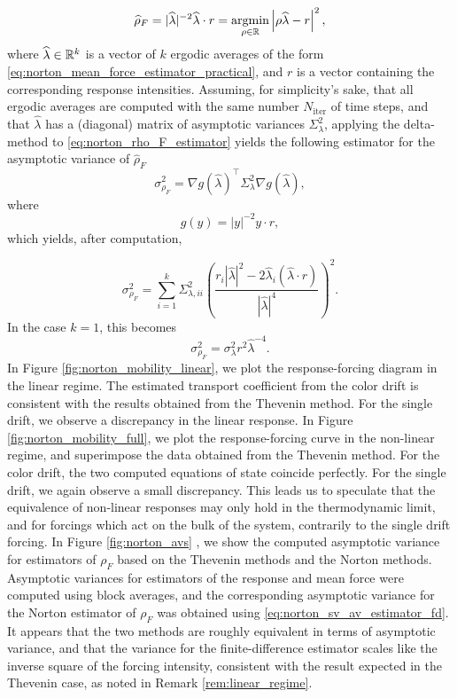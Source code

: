 \begin{equation}
    \label{eq:norton_rho_F_estimator}
    \widehat{\rho}_F= |\widehat{\lambda}|^{-2}\widehat{\lambda}\cdot r= \underset{\rho \in \mathbb{R}}{\mathrm{argmin}} \left| \rho\widehat{\lambda} - r\right|^2,
\end{equation}
where $\widehat{\lambda} \in \mathbb{R}^k$ is a vector of $k$ ergodic averages of the form \eqref{eq:norton_mean_force_estimator_practical}, and $r$ is a vector containing the corresponding response intensities.
Assuming, for simplicity's sake, that all ergodic averages are computed with the same number $N_{\mathrm{iter}}$ of time steps, and that $\widehat{\lambda}$ has a (diagonal) matrix of asymptotic variances $\Sigma_\lambda^2$, applying the delta-method to \eqref{eq:norton_rho_F_estimator} yields
the following estimator for the asymptotic variance of $\widehat{\rho}_F$
\[
\sigma^2_{\rho_F}= \nabla g(\widehat{\lambda})^\intercal \Sigma^2_\lambda\nabla g(\widehat{\lambda}),
\]
where 
\[g(y)=|y|^{-2}y\cdot r,\]
which yields, after computation,

\begin{equation}
    \label{eq:norton_sv_av_estimator}
    \sigma^2_{\rho_F} = \sum_{i=1}^k \Sigma_{\lambda,ii}^2\left(\frac{r_i|\widehat{\lambda}|^2-2\widehat{\lambda}_i(\widehat{\lambda}\cdot r)}{|\widehat{\lambda}|^4}\right)^2.
\end{equation}
In the case $k=1$, this becomes
\begin{equation}
    \label{eq:norton_sv_av_estimator_fd}
    \sigma^2_{\rho_F}=\sigma_{\lambda}^2 r^2\widehat{\lambda}^{-4}.
\end{equation}
In Figure \ref{fig:norton_mobility_linear}, we plot the response-forcing diagram in the linear regime. 
The estimated transport coefficient from the color drift is consistent with the results obtained from the Thevenin method. For the single drift, we observe a discrepancy in the linear response.
In Figure \ref{fig:norton_mobility_full}, we plot the response-forcing curve in the non-linear regime, and superimpose the data obtained from the Thevenin method. 
For the color drift, the two computed equations of state coincide perfectly. For the single drift, we again observe a small discrepancy.
This leads us to speculate that the equivalence of non-linear responses may only hold in the thermodynamic limit, and for forcings which act on the bulk of the system, contrarily to the single drift forcing.
In Figure \ref{fig:norton_avs} , we show the computed asymptotic variance for estimators of $\rho_F$ based on the Thevenin methods and the Norton methods. 
Asymptotic variances for estimators of the response and mean force were computed using block averages, and the corresponding asymptotic variance for the Norton estimator of $\rho_F$ was obtained using \eqref{eq:norton_sv_av_estimator_fd}.
It appears that the two methods are roughly equivalent in terms of asymptotic variance, and that the variance for the finite-difference estimator scales like the inverse square of the forcing intensity, consistent with the result expected in the Thevenin case, as noted in Remark \ref{rem:linear_regime}.

